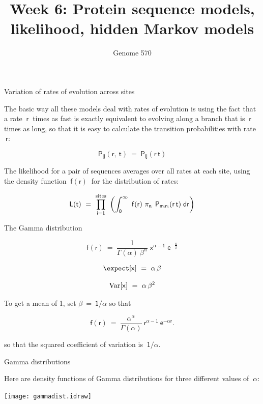 \documentclass[bluish,slideColor,colorBG,pdf]{prosper}
\title{Week 6:  Protein sequence models, likelihood, hidden Markov models}
\author{Genome 570}
\def\Var{{\rm Var}}        %
\begin{document}
\maketitle

\begin{slide}[Replace]{Variation of rates of evolution across sites}
\bigskip

The basic way all these models deal with rates of evolution is using the fact
that a rate $\ \mathsf{r}\ $ times as fast is exactly equivalent to evolving
along a branch that is $\ \mathsf{r}\ $ times as long, so that it is easy to
calculate the transition probabilities with rate $\ \mathsf{r}$:

\[
\mathsf{P_{ij}(r,\ t) \ = \ P_{ij}(r\,t)}
\]
\bigskip

The likelihood for a pair of sequences averages over all rates at each
site, using the density function $\ \mathsf{f(r)}\ $ for the distribution of
rates:
\bigskip

{
\[
\mathsf{L(t)\ =\ \prod\limits_{i=1}^{\rm sites}\ \left(\int_0^{\infty}\ f(r)\ \pi_{n_i}\;P_{m_in_i}(r\,t)\;dr \right)}
\]
}

\end{slide}

\begin{slide}[Replace]{The Gamma distribution}

\[
\mathsf{f(r)\ =\ \frac{1}{\Gamma(\alpha)\ \beta^\alpha}\;x^{\alpha-1}\;e^{- \frac{x}{\beta}}}
\]

\[
\mathsf{\expect[x]\ =\ \alpha\,\beta}
\]

\[
\mathsf{\Var[x]\ =\  \alpha\,\beta^2}
\]

To get a mean of 1, set  $\mathsf{\beta\ =\ 1/\alpha}$ so that

\[
\mathsf{f(r)\ =\ \frac{\alpha^\alpha}{\Gamma(\alpha) }\ r^{\alpha-1}\ e^{- \alpha r }}.
\]

so that the squared coefficient of variation is $~\mathsf{1/\alpha}$.

\end{slide}

\begin{slide}[Replace]{Gamma distributions}
\bigskip

Here are density functions of Gamma  distributions for three different values
of $\ \mathsf{\alpha}$:

\centerline{\texttt{[image: gammadist.idraw]}}

\end{slide}
\end{document}
